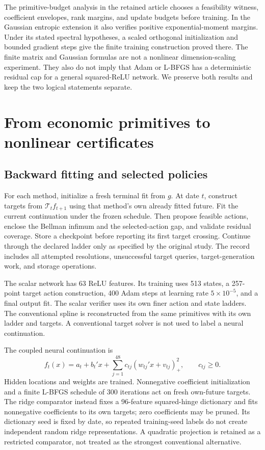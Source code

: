 \documentclass[ecta,nameyear,draft]{econsocart}
\begin{document}
The primitive-budget analysis in the retained article chooses a feasibility witness, coefficient envelopes, rank margins, and update budgets before training. In the Gaussian entropic extension it also verifies positive exponential-moment margins. Under its stated spectral hypotheses, a scaled orthogonal initialization and bounded gradient steps give the finite training construction proved there. The finite matrix and Gaussian formulas are not a nonlinear dimension-scaling experiment. They also do not imply that Adam or L-BFGS has a deterministic residual cap for a general squared-ReLU network. We preserve both results and keep the two logical statements separate.

\section{From economic primitives to nonlinear certificates}\label{sec:algorithm}
\subsection{Backward fitting and selected policies}
For each method, initialize a fresh terminal fit from $g$. At date $t$, construct targets from $\mathcal T_tf_{t+1}$ using that method's own already fitted future. Fit the current continuation under the frozen schedule. Then propose feasible actions, enclose the Bellman infimum and the selected-action gap, and validate residual coverage. Store a checkpoint before reporting its first target crossing. Continue through the declared ladder only as specified by the original study. The record includes all attempted resolutions, unsuccessful target queries, target-generation work, and storage operations.

The scalar network has 63 ReLU features. Its training uses 513 states, a 257-point target action construction, 400 Adam steps at learning rate $5\times10^{-5}$, and a final output fit. The scalar verifier uses its own finer action and state ladders. The conventional spline is reconstructed from the same primitives with its own ladder and targets. A conventional target solver is not used to label a neural continuation.

The coupled neural continuation is
\begin{equation}\label{eq:network}
 f_t(x)=a_t+b_t'x+\sum_{j=1}^{48}c_{tj}(w_{tj}'x+v_{tj})_+^2,
 \qquad c_{tj}\geq0.
\end{equation}
Hidden locations and weights are trained. Nonnegative coefficient initialization and a finite L-BFGS schedule of 300 iterations act on fresh own-future targets. The ridge comparator instead fixes a 96-feature squared-hinge dictionary and fits nonnegative coefficients to its own targets; zero coefficients may be pruned. Its dictionary seed is fixed by date, so repeated training-seed labels do not create independent random ridge representations. A quadratic projection is retained as a restricted comparator, not treated as the strongest conventional alternative.
\end{document}
